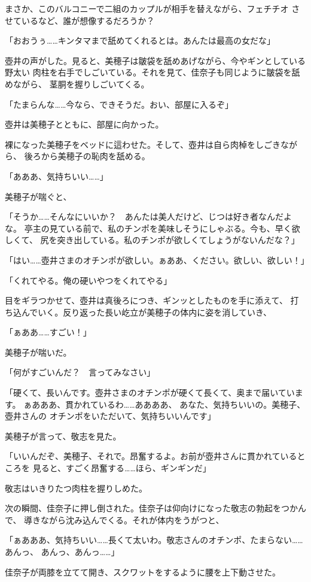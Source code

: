 ﻿\documentclass[
    book,tate,
    line_length=30zw,
    jafontsize=12pt,
    paper=b5j,
    landscape,
    ]{jlreq}
\begin{document}
まさか、このバルコニーで二組のカップルが相手を替えながら、フェチチオ
させているなど、誰が想像するだろうか？

「おおうぅ……キンタマまで舐めてくれるとは。あんたは最高の女だな」

壺井の声がした。見ると、美穂子は皺袋を舐めあげながら、今やギンとしている野太い
肉柱を右手でしごいている。それを見て、佳奈子も同じように皺袋を舐めながら、
茎胴を握りしごいてくる。

「たまらんな……今なら、できそうだ。おい、部屋に入るぞ」

壺井は美穂子とともに、部屋に向かった。

裸になった美穂子をベッドに這わせた。そして、壺井は自ら肉棹をしごきながら、
後ろから美穂子の恥肉を舐める。

「あああ、気持ちいい……」

美穂子が喘ぐと、

「そうか……そんなにいいか？　あんたは美人だけど、じつは好き者なんだよな。
亭主の見ている前で、私のチンポを美味しそうにしゃぶる。今も、早く欲しくて、
尻を突き出している。私のチンポが欲しくてしょうがないんだな？」

「はい……壺井さまのオチンポが欲しい。ぁああ、ください。欲しい、欲しい！」

「くれてやる。俺の硬いやつをくれてやる」

目をギラつかせて、壺井は真後ろにつき、ギンッとしたものを手に添えて、
打ち込んでいく。反り返った長い屹立が美穂子の体内に姿を消していき、

「ぁああ……すごい！」

美穂子が喘いだ。

「何がすごいんだ？　言ってみなさい」

「硬くて、長いんです。壺井さまのオチンポが硬くて長くて、奥まで届いています。
ぁあああ、貫かれているわ……ああああ、 あなた、気持ちいいの。美穂子、壺井さんの
オチンポをいただいて、気持ちいいんです」

美穂子が言って、敬志を見た。

「いいんだぞ、美穂子、それで。昂奮するよ。お前が壺井さんに貫かれているところを
見ると、すごく昂奮する……ほら、ギンギンだ」

敬志はいきりたつ肉柱を握りしめた。

次の瞬間、佳奈子に押し倒された。佳奈子は仰向けになった敬志の勃起をつかんで、
導きながら沈み込んでくる。それが体内をうがつと、

「ぁあああ、気持ちいい……長くて太いわ。敬志さんのオチンポ、たまらない……あんっ、
あんっ、あんっ……」

佳奈子が両膝を立てて開き、スクワットをするように腰を上下動させた。
\end{document}
